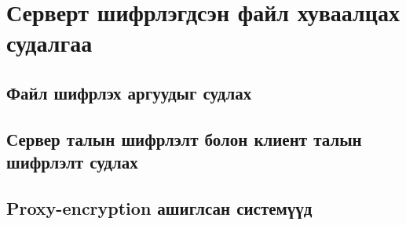 
\chapter{Серверт шифрлэгдсэн файл хуваалцах судалгаа} %
\label{Chapter2} %
\pagecolor{white}

\section{Файл шифрлэх аргуудыг судлах}
\section{Сервер талын шифрлэлт болон клиент талын
шифрлэлт судлах}
\section{Proxy-encryption ашиглсан системүүд}